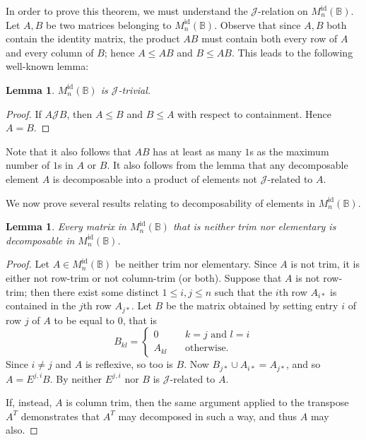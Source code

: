 \documentclass[11pt]{article}
\newtheorem{lemma}[thm]{Lemma}
\numberwithin{equation}{section}
\newcommand{\B}{\mathbb{B}}
\newcommand{\Refln}{M_n^{\text{id}}(\B)}
\newcommand{\J}{\mathscr{J}}
\begin{document}
In order to prove this theorem, we must understand the  $\J$-relation on
$\Refln$. Let $A, B$ be two matrices belonging to $\Refln$. Observe that since $A,
B$ both contain the identity matrix, the product $AB$ must contain both every
row of $A$ and every column of $B$; hence $A \leq AB$ and $B \leq AB$. This
leads to the following well-known lemma:

\begin{lemma}
  $\Refln$ is $\J$-trivial. 
\end{lemma}
\begin{proof}
  If $A \J B$, then $A \leq B$ and $B \leq A$ with respect to containment. Hence
  $A = B$.    
\end{proof}
Note that it also follows that $AB$ has at least as many $1$s as the maximum
number of $1$s in $A$ or $B$. It also follows from the lemma that any
decomposable element $A$ is decomposable into a product of elements not
$\J$-related to $A$.

We now prove several results relating to decomposability of elements in $\Refln$.

\begin{lemma}
  Every matrix in $\Refln$ that is neither trim nor elementary is decomposable in
  $\Refln$.
\end{lemma}
\begin{proof}
  Let $A \in \Refln$ be neither trim nor elementary.
  Since $A$ is not trim, it is either not row-trim or not column-trim (or both).
  Suppose that $A$ is not row-trim; then there exist some distinct $1 \leq i, j
  \leq n$ such that the $i$th row $A_{i*}$ is contained in the $j$th row
  $A_{j*}$.
  Let $B$ be the matrix obtained by setting entry $i$ of row $j$ of $A$ to be
  equal to $0$, that is
  \[B_{kl} = \begin{cases} 
                0 \quad& k = j \text{ and } l = i \\ 
                A_{kl} \quad& \text{otherwise.} 
              \end{cases} \]
  Since $i \neq j$ and $A$ is reflexive, so too is $B$. Now $B_{j*} \cup A_{i*}
  = A_{j*}$, and so $A = E^{j,i}B$. By  neither
  $E^{j,i}$ nor $B$ is $\J$-related to $A$.
  
  If, instead, $A$ is column trim, then the same argument applied to the
  transpose $A^T$ demonstrates that $A^T$ may decomposed in such a way, and thus
  $A$ may also.
\end{proof}
\end{document}
